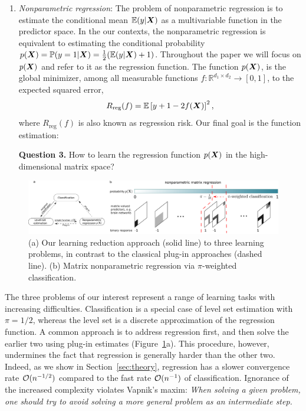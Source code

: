 \documentclass[11pt]{article}
\theoremstyle{definition}
\begin{document}
\begin{enumerate}[label={2.\arabic*},wide, labelwidth=!, labelindent=0pt]
{\bf Question 2.} How to simultaneously estimate the level set and identify important variables in the matrix-valued predictor space, for the goal of interpretable prediction?


\item {\it Nonparametric regression}: The problem of nonparametric regression is to estimate the conditional mean $\mathbb{E}(y|\bm X)$ as a multivariable function in the predictor space. In the our contexts, the nonparametric regression is equivalent to estimating the conditional probability $p(\bm X)=\mathbb{P}(y=1|\bm X)=\frac{1}{2}(\mathbb{E}(y|\bm X)+1)$. Throughout the paper we will focus on $p(\bm X)$ and refer to it as the regression function. 
The function $p(\bm X)$, is the global minimizer, among all measurable functions $f\colon \mathbb{R}^{d_1\times d_2}\to[0,1]$, to the expected squared error,
\begin{equation}\label{eq:regression}
R_{\text{reg}}(f)=\mathbb{E}\left[y+1-2f(\bm X)\right]^2,
\end{equation}
where $R_{\text{reg}}(f)$ is also known as regression risk. Our final goal is the function estimation:

{\bf Question 3.} How to learn the regression function $p(\bm X)$ in the high-dimensional matrix space?
\end{enumerate}


\begin{figure}\centering
\includegraphics[width=1\textwidth]{new_demo.pdf}
\caption{(a) Our learning reduction approach (solid line) to three learning problems, in contrast to the classical plug-in approaches (dashed line). (b) Matrix nonparametric regression via $\pi$-weighted classification.}\label{fig:diagram}
\end{figure}

The three problems of our interest represent a range of learning tasks with increasing difficulties. Classification is a special case of level set estimation with $\pi=1/2$, whereas the level set is a discrete approximation of the regression function. A common approach is to address regression first, and then solve the earlier two using plug-in estimates (Figure~\ref{fig:diagram}a). This procedure, however, undermines the fact that regression is generally harder than the other two. Indeed, as we show in Section~\ref{sec:theory}, regression has a slower convergence rate $\mathcal{O}(n^{-1/2})$ compared to the fast rate $\mathcal{O}(n^{-1})$ of classification. Ignorance of the increased complexity violates Vapnik’s maxim: \emph{When solving a given problem, one should try to avoid solving a more general problem as an intermediate step.} 
\end{document}
